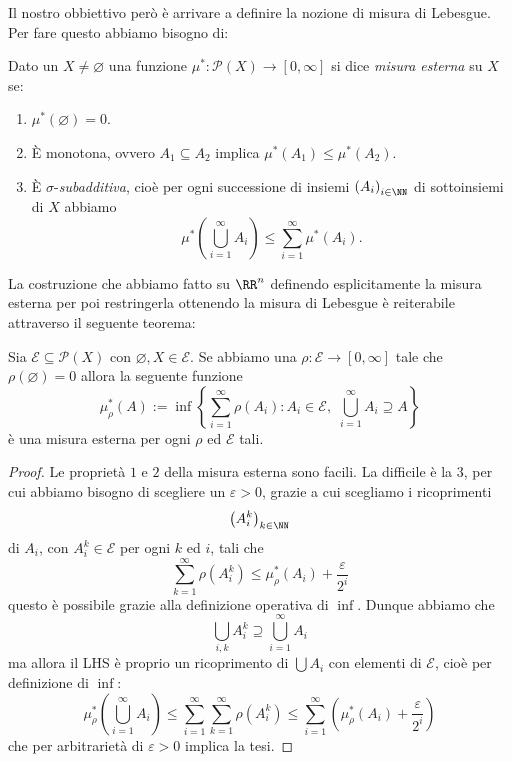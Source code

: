\documentclass[11pt]{scrartcl}
\newcommand{\eset}{\varnothing}
\newcommand{\parti}[1]{\mathcal{P}\!\left(#1\right)}
\begin{document}
	Il nostro obbiettivo però è arrivare a definire la nozione di misura di Lebesgue. Per fare questo abbiamo bisogno di:
	\begin{definition}
		Dato un $X\ne \eset$ una funzione $\mu^*:\parti{X}\to [0,\infty]$ si dice \textit{misura esterna} su $X$ se:
		\begin{enumerate}
			\item $\mu^*(\eset)=0$.
			\item \`E monotona, ovvero $A_1\subseteq A_2$ implica $\mu^*(A_1)\le \mu^*(A_2)$.
			\item \`E $\sigma$-\textit{subadditiva}, cioè per ogni successione di insiemi $\left(A_i\right)_{i\in\NN}$ di sottoinsiemi di $X$ abbiamo
			$$\mu^*\left(\bigcup_{i=1}^\infty A_i\right)\le \sum_{i=1}^{\infty}\mu^*(A_i).$$
		\end{enumerate}
	\end{definition}
	La costruzione che abbiamo fatto su $\RR^n$ definendo esplicitamente la misura esterna per poi restringerla ottenendo la misura di Lebesgue è reiterabile attraverso il seguente teorema:
	\begin{theorem}
		Sia $\mathcal{E}\subseteq \parti{X}$ con $\eset,X\in \mathcal{E}$. Se abbiamo una $\rho:\mathcal{E}\to [0,\infty]$ tale che $\rho(\eset)=0$ allora la seguente funzione
		$$\mu^*_\rho(A):=\inf\left\{\sum_{i=1}^{\infty}\rho(A_i):A_i\in \mathcal{E},\,\,\bigcup_{i=1}^\infty A_i \supseteq A\right\}$$
		è una misura esterna per ogni $\rho$ ed $\mathcal{E}$ tali.
	\end{theorem}
	\begin{proof}
		Le proprietà $1$ e $2$ della misura esterna sono facili. La difficile è la $3$, per cui abbiamo bisogno di scegliere un $\varepsilon>0$, grazie a cui scegliamo i ricoprimenti
		$$\left(A_i^k\right)_{k\in\NN}$$
		di $A_i$, con $A^k_i\in \mathcal{E}$ per ogni $k$ ed $i$, tali che
		$$\sum_{k=1}^{\infty}\rho\left(A_i^k\right)\le \mu^*_\rho(A_i)+\frac{\varepsilon}{2^i}$$
		questo è possibile grazie alla definizione operativa di $\inf$. Dunque abbiamo che
		$$\bigcup_{i,k}A_i^k\supseteq \bigcup_{i=1}^\infty A_i$$
		ma allora il LHS è proprio un ricoprimento di $\bigcup A_i$ con elementi di $\mathcal{E}$, cioè per definizione di $\inf$:
		$$\mu^*_\rho\left(\bigcup_{i=1}^\infty A_i\right)\le \sum_{i=1}^{\infty}\sum_{k=1}^{\infty}\rho\left(A_i^k\right)\le \sum_{i=1}^{\infty}\left(\mu^*_\rho(A_i)+\frac{\varepsilon}{2^i}\right)$$
		che per arbitrarietà di $\varepsilon>0$ implica la tesi.
	\end{proof}	
\end{document}
